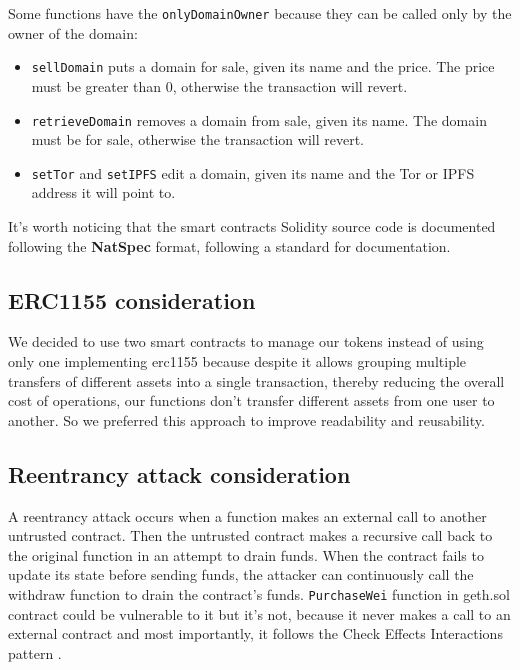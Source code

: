\documentclass[main.tex]{subfiles}
\begin{document}
Some functions have the \texttt{onlyDomainOwner} because they can be called only by the owner of the domain:
\begin{itemize}
    \item \texttt{sellDomain} puts a domain for sale, given its name and the price. The price must be greater than 0, otherwise the transaction will revert.
    \item \texttt{retrieveDomain} removes a domain from sale, given its name. The domain must be for sale, otherwise the transaction will revert.
    \item \texttt{setTor} and \texttt{setIPFS} edit a domain, given its name and the Tor or IPFS address it will point to.
\end{itemize}

It's worth noticing that the smart contracts Solidity source code is documented following the \textbf{NatSpec} format, following a standard for documentation.

\subsection{ERC1155 consideration}
We decided to use two smart contracts to manage our tokens instead of using only one implementing erc1155 because despite it allows grouping multiple transfers of different assets into a single transaction, thereby reducing the overall cost of operations, our functions don't transfer different assets from one user to another. So we preferred this approach to improve readability and reusability.

\subsection{Reentrancy attack consideration}
A reentrancy attack\cite{reentrancyAttack} occurs when a function makes an external call to another untrusted contract. Then the untrusted contract makes a recursive call back to the original function in an attempt to drain funds.
When the contract fails to update its state before sending funds, the attacker can continuously call the withdraw function to drain the contract’s funds. \texttt{PurchaseWei} function in geth.sol contract could be vulnerable to it but it's not, because it never makes a call to an external contract and most importantly, it follows the Check Effects Interactions pattern \cite{CEIPattern}. 
\end{document}
